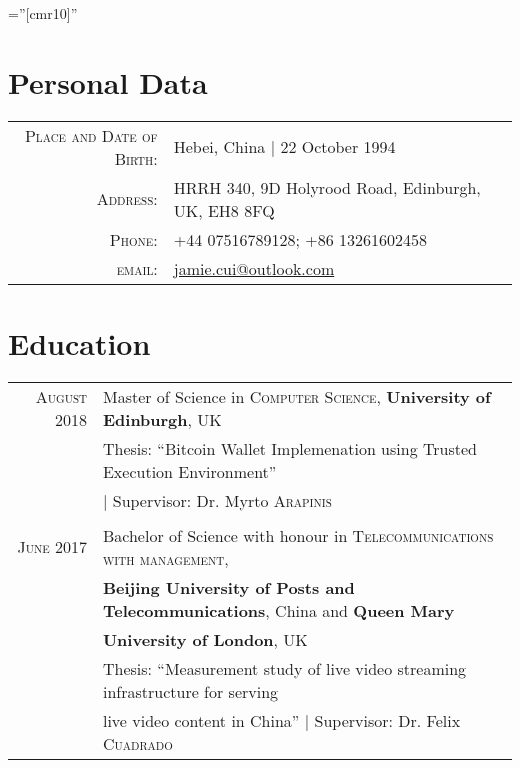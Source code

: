 \documentclass[a4paper,10pt]{article}
\begin{document}
\pagestyle{empty} %

\font\fb=''[cmr10]'' %

\par{
  \bigskip
  \par
}

\section{Personal Data}

\begin{tabular}{rl}
    \textsc{Place and Date of Birth:} & Hebei, China  | 22 October 1994 \\
    \textsc{Address:}   & HRRH 340, 9D Holyrood Road, Edinburgh, UK, EH8 8FQ \\
    \textsc{Phone:}     & +44 07516789128; +86 13261602458\\
    \textsc{email:}     & \href{mailto:jamie.cui@outlook.com}{jamie.cui@outlook.com}\\
\end{tabular}


\section{Education}
\begin{tabular}{rl}	
  \textsc{August} 2018 & Master of Science in \textsc{Computer Science}, \textbf{University of Edinburgh}, UK \\
  & Thesis: ``Bitcoin Wallet Implemenation using Trusted Execution Environment'' \\
  & | \small Supervisor: Dr. Myrto \textsc{Arapinis}\\
  & \\

  \textsc{June} 2017 & Bachelor of Science with honour in \textsc{Telecommunications with management}, \\& \normalsize\textbf{Beijing University of Posts and Telecommunications}, China and \normalsize\textbf{Queen Mary}\\& \normalsize\textbf{University of London}, UK\\
  & Thesis: ``Measurement study of live video streaming infrastructure for serving\\& live video content in China'' | \small Supervisor: Dr. Felix \textsc{Cuadrado}\\

\end{tabular}
\end{document}
